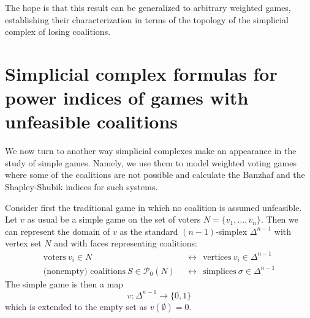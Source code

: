 \documentclass[11pt]{amsart}
\theoremstyle{plain}
\theoremstyle{definition}
\theoremstyle{remark}
\begin{document}
The hope is that this result can be generalized to arbitrary weighted games, establishing their characterization in terms of the topology of the simplicial complex of losing coalitions. 









\section{Simplicial complex formulas for power indices of games with unfeasible coalitions}\label{S:Computing}



We now turn to another way simplicial complexes make an appearance in the study of simple games. Namely, we use them to model weighted voting games where some of the coalitions are not possible and calculate the Banzhaf and the Shapley-Shubik indices for such systems.



Consider first the traditional game in which no coalition is assumed unfeasible. Let $v$ as usual be a simple game on the set of voters $N=\{v_1, ..., v_n\}$. Then we can represent the domain of $v$ as the standard $(n-1)$-simplex $\Delta^{n-1}$ with vertex set $N$ and with faces representing coalitions:
\begin{align*}
\text{voters}\  v_i\in N\ \ & \longleftrightarrow\ \    \text{vertices}\  v_i\in \Delta^{n-1} \\
\text{(nonempty) coalitions}\  S\in \mathcal{P}_0(N) \ \ & \longleftrightarrow\ \  \text{simplices}\  \sigma\in \Delta^{n-1}
\end{align*}
The simple game is then a map
$$
v\colon \Delta^{n-1}\longrightarrow \{0,1\}
$$
which is extended to the empty set as $v(\emptyset)=0$. 
\end{document}

